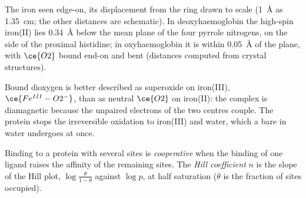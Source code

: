 \begin{omfigure}

{\small The  iron seen edge-on, its displacement from the ring drawn to
scale (1~\AA{} as 1.35~cm; the other distances are schematic). In deoxyhaemoglobin the high-spin iron(II) lies
\qty{0.34}{\angstrom} below the mean plane of the four pyrrole nitrogens, on the side of the
proximal histidine; in oxyhaemoglobin it is within \qty{0.05}{\angstrom} of the plane, with $\ce{O2}$
bound end-on and bent (distances computed from crystal structures).}
\end{omfigure}

Bound dioxygen is better described as superoxide on iron(III), $\ce{Fe^{III}-O2^-}$, than as
neutral $\ce{O2}$ on iron(II): the complex is diamagnetic because the unpaired
electrons of the two centres couple. The protein stops the irreversible
oxidation to iron(III) and water, which a bare  in water undergoes at
once.

\begin{definition}\label{def:b3:bioinorganic:cooperativity}
Binding to a protein with several sites is \emph{cooperative}
when the binding of one ligand raises the affinity of the remaining
sites. The \emph{Hill coefficient} $n$ is the slope of the
Hill plot, $\log\frac{\theta}{1 - \theta}$ against $\log p$, at half saturation ($\theta$ is the fraction of sites
occupied).
\end{definition}

